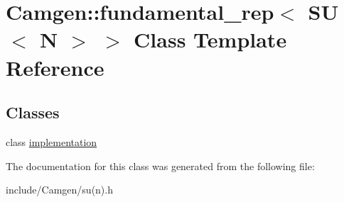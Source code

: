 \hypertarget{a00237}{}\section{Camgen\+:\+:fundamental\+\_\+rep$<$ S\+U$<$ N $>$ $>$ Class Template Reference}
\label{a00237}
\subsection*{Classes}
\begin{DoxyCompactItemize}
\item 
class \hyperlink{a00290}{implementation}
\end{DoxyCompactItemize}


The documentation for this class was generated from the following file\+:\begin{DoxyCompactItemize}
\item 
include/\+Camgen/su(n).\+h\end{DoxyCompactItemize}
